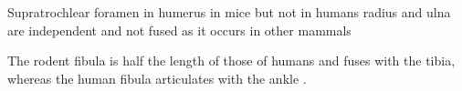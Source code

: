 \noindent
Supratrochlear foramen in humerus in mice but not in humans \cite{ruberteMorphologicalMousePhenotyping2017,platzerTaschenatlasAnatomieBd2013}
radius and ulna are independent and not fused as it occurs in other mammals

\noindent
The rodent fibula is half the length of those of humans and fuses with the tibia,
whereas the human fibula articulates with the ankle \cite{jeromeSkeletalSystem2018,platzerTaschenatlasAnatomieBd2013}.


